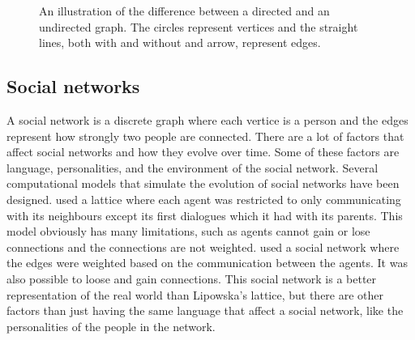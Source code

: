 \begin{figure}[htbp]
    \centering
    \qquad\qquad\qquad
    \caption[Illustration of the difference between a directed and an undirected graph.]{An illustration of the difference between a directed and an undirected graph. The circles represent vertices and the straight lines, both with and without and arrow, represent edges.}
    \label{fig:graph}
\end{figure}

\acresetall
\subsection{Social networks}
A social network is a discrete graph where each vertice is a person and the edges represent how strongly two people are connected. There are a lot of factors that affect social networks and how they evolve over time. Some of these factors are language, personalities, and the environment of the social network. Several computational models that simulate the evolution of social networks have been designed. \citet{lipowska2011naming} used a lattice where each agent was restricted to only communicating with its neighbours except its first dialogues which it had with its parents. This model obviously has many limitations, such as agents cannot gain or lose connections and the connections are not weighted. 
\citet{lekvam2014co} used a social network where the edges were weighted based on the communication between the agents. It was also possible to loose and gain connections. This social network is a better representation of the real world than Lipowska's lattice, but there are other factors than just having the same language that affect a social network, like the personalities of the people in the network.



